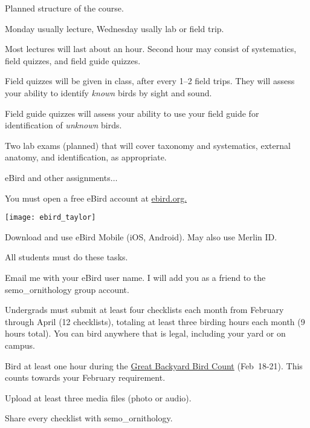 \documentclass[t,handout]{beamer}  %
\begin{document}
\begin{frame}[t]{Planned structure of the course.}

\vspace{-\baselineskip}

\hangpara Monday usually lecture, Wednesday usally lab or field trip.

\hangpara Most lectures will last about an hour. Second hour may consist of systematics, field quizzes, and field guide quizzes.

\hangpara Field quizzes will be given in class, after every 1–2 field trips. They will assess your ability to identify \textit{known} birds by sight and sound. 

\hangpara Field guide quizzes will assess your ability to use your field guide for identification of \textit{unknown} birds.

\hangpara Two lab exams (planned) that will cover taxonomy and systematics, external anatomy, and identification, as appropriate.

\hangpara eBird and other assignments$\dots$

\end{frame}


{
\begin{frame}{You must open a free eBird account at \href{https://ebird.org}{ebird.org.}}
	\vspace{-\baselineskip}
	\begin{center}
		\texttt{[image: ebird\_taylor]}
	\end{center}
	
	Download and use eBird Mobile (iOS, Android). May also use Merlin ID.
%	
\end{frame}
}

{
\begin{frame}{All students must do these tasks.}

\vspace{-\baselineskip}

\hangpara Email me with your eBird user name. I will add you as a friend to the semo\_ornithology group account.

\hangpara Undergrads must submit at least four checklists each month from February through April (12 checklists), totaling at least three birding hours each month (9 hours total). You can bird anywhere that is legal, including your yard or on campus.

\hangpara Bird at least one hour during the \href{https://www.birdcount.org/}{Great Backyard Bird Count} (Feb~18-21). This counts towards your February requirement.

\hangpara Upload at least three media files (photo or audio).

\hangpara Share every checklist with semo\_ornithology.

\hangpara \href{https://support.ebird.org/en/support/solutions/articles/48000795623-ebird-rules-and-best-practices}{}

\end{frame}
}
\end{document}
